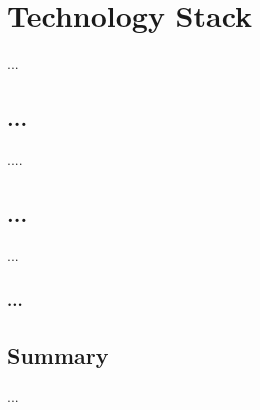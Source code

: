\chapter{Technology Stack}
\label{ch:lit_rev}

...
\section{...}
....


\section{...}
...


\subsection{...}


\section{Summary}
...


